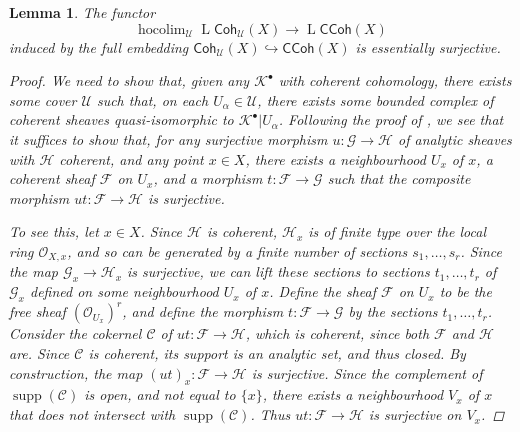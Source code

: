 \documentclass[11pt,fleqn]{article}
\theoremstyle{plain}
\newtheorem{lemma}[theorem]{Lemma}
\theoremstyle{definition}
\theoremstyle{remark}
\numberwithin{equation}{theorem}
\newcommand{\cover}{\mathcal{U}}
\newcommand{\OO}{\mathcal{O}}
\newcommand{\restricted}{\mathbin{\big\vert}}
\newcommand{\gcohUX}{\mathsf{Coh}_{\cover}(X)}
\newcommand{\gccohX}{\mathsf{CCoh}(X)}
\DeclareMathOperator{\LL}{L}
\DeclareMathOperator{\hocolim}{hocolim}
\begin{document}
        \begin{lemma}\label{lemma:gcohUX-to-gccohX-essentially-surjective}
            The functor
            \[
                \hocolim_\cover\LL{\gcohUX}\to\LL{\gccohX}
            \]
            induced by the full embedding $\gcohUX\hookrightarrow\gccohX$ is essentially surjective.

            \begin{proof}
                We need to show that, given any $\mathscr{K}^\bullet$ with coherent cohomology, there exists some cover $\cover$ such that, on each $U_\alpha\in\cover$, there exists some bounded complex of coherent sheaves quasi-isomorphic to $\mathscr{K}^\bullet\restricted U_\alpha$.
                Following the proof of \cite[Proposition~1.7.11]{Kashiwara&Schapira1990}, we see that it suffices to show that, for any surjective morphism $u\colon\mathscr{G}\to\mathscr{H}$ of analytic sheaves with $\mathscr{H}$ coherent, and any point $x\in X$, there exists a neighbourhood $U_x$ of $x$, a coherent sheaf $\mathscr{F}$ on $U_x$, and a morphism $t\colon\mathscr{F}\to\mathscr{G}$ such that the composite morphism $ut\colon\mathscr{F}\to\mathscr{H}$ is surjective.

                To see this, let $x\in X$.
                Since $\mathscr{H}$ is coherent, $\mathscr{H}_x$ is of finite type over the local ring $\OO_{X,x}$, and so can be generated by a finite number of sections $s_1,\ldots,s_r$.
                Since the map $\mathscr{G}_x\to\mathscr{H}_x$ is surjective, we can lift these sections to sections $t_1,\ldots,t_r$ of $\mathscr{G}_x$ defined on some neighbourhood $U_x$ of $x$.
                Define the sheaf $\mathscr{F}$ on $U_x$ to be the free sheaf $(\OO_{U_x})^r$, and define the morphism $t\colon\mathscr{F}\to\mathscr{G}$ by the sections $t_1,\ldots,t_r$.
                Consider the cokernel $\mathscr{C}$ of $ut\colon\mathscr{F}\to\mathscr{H}$, which is coherent, since both $\mathscr{F}$ and $\mathscr{H}$ are.
                Since $\mathscr{C}$ is coherent, its support is an analytic set, and thus closed.
                By construction, the map $(ut)_x\colon\mathscr{F}\to\mathscr{H}$ is surjective.
                Since the complement of $\operatorname{supp}(\mathscr{C})$ is open, and not equal to $\{x\}$, there exists a neighbourhood $V_x$ of $x$ that does not intersect with $\operatorname{supp}(\mathscr{C})$.
                Thus $ut\colon\mathscr{F}\to\mathscr{H}$ is surjective on $V_x$.
            \end{proof}
        \end{lemma}
\end{document}
